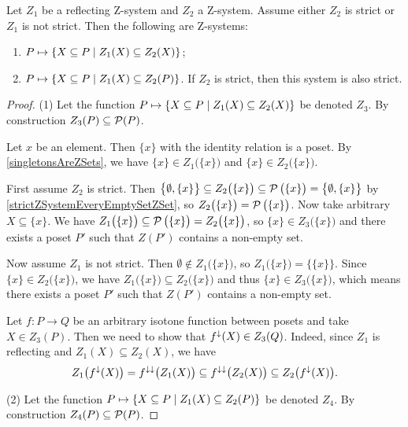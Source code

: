 \begin{lemma} \label{ZsystemWhereAllZSetsAreZSets}
Let $Z_1$ be a reflecting $\mathrm{Z}$-system and $Z_2$ a $\mathrm{Z}$-system. Assume either $Z_2$ is strict or $Z_1$ is not strict. Then the following are $\mathrm{Z}$-systems:
\begin{enumerate}
\item $P\mapsto \setbuilder{X \subseteq P}{Z_1(X)\subseteq Z_2(X)}$;
\item $P\mapsto \setbuilder{X \subseteq P}{Z_1(X)\subseteq Z_2(P)}$. If $Z_2$ is strict, then this system is also strict.
\end{enumerate}
\end{lemma}
\begin{proof}
(1) Let the function $P\mapsto \setbuilder{X \subseteq P}{Z_1(X)\subseteq Z_2(X)}$ be denoted $Z_3$. By construction $Z_3(P) \subseteq \operatorname{\mathcal{P}}(P)$.

Let $x$ be an element. Then $\{x\}$ with the identity relation is a poset. By \ref{singletonsAreZSets}, we have $\{x\} \in Z_1\big(\{x\}\big)$ and $\{x\} \in Z_2\big(\{x\}\big)$.

First assume $Z_2$ is strict. Then $\big\{\emptyset, \{x\}\big\} \subseteq Z_2\big(\{x\}\big) \subseteq \operatorname{\mathcal{P}}\big(\{x\}\big) = \big\{\emptyset, \{x\}\big\}$ by \ref{strictZSystemEveryEmptySetZSet}, so $Z_2\big(\{x\}\big) = \operatorname{\mathcal{P}}\big(\{x\}\big)$. Now take arbitrary $X\subseteq \{x\}$. We have $Z_1\big(\{x\}\big) \subseteq \operatorname{\mathcal{P}}\big(\{x\}\big) = Z_2\big(\{x\}\big)$, so $\{x\} \in Z_3\big(\{x\}\big)$ and there exists a poset $P'$ such that $Z(P')$ contains a non-empty set.

Now assume $Z_1$ is not strict. Then $\emptyset \notin Z_1\big(\{x\}\big)$, so $Z_1\big(\{x\}\big) = \big\{\{x\}\big\}$. Since $\{x\} \in Z_2\big(\{x\}\big)$, we have $Z_1\big(\{x\}\big) \subseteq Z_2\big(\{x\})$ and thus $\{x\} \in Z_3\big(\{x\}\big)$, which means there exists a poset $P'$ such that $Z(P')$ contains a non-empty set.

Let $f: P\to Q$ be an arbitrary isotone function between posets and take $X\in Z_3(P)$. Then we need to show that $f^\downarrow(X) \in Z_3(Q)$. Indeed, since $Z_1$ is reflecting and $Z_1(X) \subseteq Z_2(X)$, we have
\[ Z_1\big(f^\downarrow(X)\big) = f^{\downarrow\downarrow}\big(Z_1(X)\big) \subseteq f^{\downarrow\downarrow}\big(Z_2(X)\big) \subseteq Z_2\big(f^\downarrow(X)\big). \]

(2) Let the function $P\mapsto \setbuilder{X \subseteq P}{Z_1(X)\subseteq Z_2(P)}$ be denoted $Z_4$. By construction $Z_4(P) \subseteq \operatorname{\mathcal{P}}(P)$.


\end{proof}
